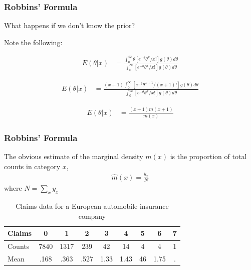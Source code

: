 \documentclass[
  shownotes,
  xcolor={svgnames},
  hyperref={colorlinks,citecolor=DarkBlue,linkcolor=DarkRed,urlcolor=DarkBlue}
  , aspectratio=169]{beamer}
\begin{document}
\begin{frame}[fragile]
\frametitle{Robbins' Formula}
What happens if we don't know the prior? 

Note the following:

\begin{align}
E(\theta|x)&=   \frac{\int_0^{\infty} \theta[e^{-\theta} \theta^x/x!]g(\theta)d\theta}{\int_0^{\infty} [e^{-\theta} \theta^x/x!]g(\theta)d\theta}
\end{align}
\medskip

\begin{align}
E(\theta|x)&=   \frac{(x+1) \int_0^{\infty} [e^{-\theta} \theta^{x+1}/(x+1)!]g(\theta)d\theta}{\int_0^{\infty} [e^{-\theta} \theta^x/x!]g(\theta)d\theta}
\end{align}

\begin{align}
E(\theta|x)&=   \frac{(x+1) m(x+1)}{m(x)} 
\end{align}

\end{frame}


\begin{frame}[fragile]
\frametitle{Robbins' Formula}
The obvious estimate of the marginal density $m(x)$ is the proportion of total counts in category $x$,
\begin{align}
\hat m(x)= \frac{y_x}{N}
\end{align}
where $N=\sum_x y_x$ 

\begin{table}[H]
\caption{Claims data for a European automobile insurance company}
\begin{tabular}{lcccccccc}
Claims & 0    & 1    & 2   & 3  & 4  & 5 & 6 & 7 \\
\hline
Counts & 7840 & 1317 & 239 & 42 & 14 & 4 & 4 & 1 \\
Mean & .168 & .363 & .527 & 1.33 & 1.43 & 46 & 1.75 & . \\
\end{tabular}
\end{table}

\end{frame}

\end{document}
